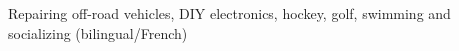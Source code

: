 \documentclass[mm]{res}
\begin{document}
\begin{resume}

\toprule

\section{\headinginterests}
\tb Repairing off-road vehicles, DIY electronics, hockey, golf, swimming and socializing (bilingual/French)

\end{resume}
\end{document}

